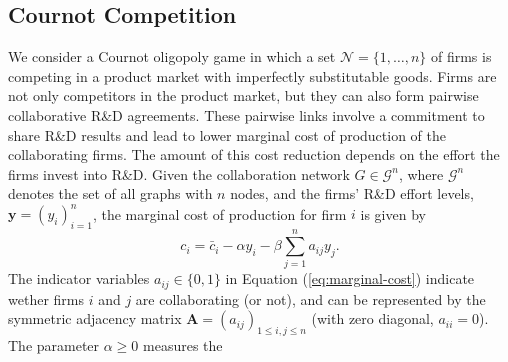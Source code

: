 \subsection{Cournot Competition}
\label{sec:cournot}
We consider a Cournot oligopoly game in which a set $\mathcal{N}=\{1,\dots,n\}$ of firms is competing in a product market with imperfectly substitutable goods. 
Firms are not only competitors in the product market, but they can also form pairwise collaborative R\&D agreements. 
These pairwise links
involve a commitment to share R\&D results and lead to lower marginal
cost of production of the collaborating firms. 
The amount of this cost reduction depends on the effort the firms invest into R\&D. Given the collaboration network $G \in \mathcal{G}^n$, where $\mathcal{G}^n$ denotes the set of all graphs with $n$ nodes, and the firms' R\&D effort levels, $\mathbf{y} = (y_i)_{i=1}^n$, the marginal cost of production for firm $i$ is given by \citep[cf.][]{goyal01:_r_d_networ}%
\begin{equation}
c_i = \bar{c}_i - \alpha y_i - \beta \sum_{j=1}^n a_{ij} y_j.
\label{eq:marginal-cost}
\end{equation}
The indicator variables $a_{ij} \in \{0,1\}$ in Equation (\ref{eq:marginal-cost}) indicate wether firms $i$ and $j$ are collaborating (or not), and can be represented by the symmetric adjacency matrix $\mathbf{A}=(a_{ij})_{1\le i,j \le n}$ (with zero diagonal, $a_{ii}=0$). The parameter $\alpha \ge 0$ \label{sym:alpha} measures the
